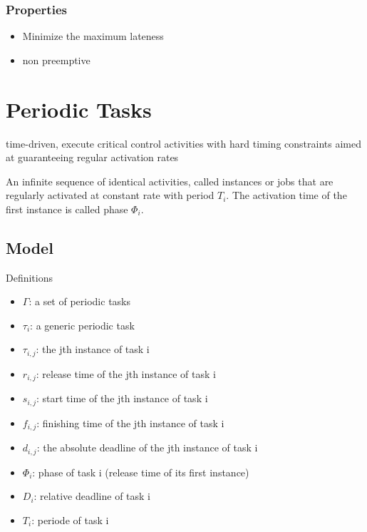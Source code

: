 \subsubsection{Properties}
\begin{itemize}[noitemsep]
\item Minimize the maximum lateness
\item non preemptive
\end{itemize}



\newpage











\section{Periodic Tasks}

time-driven, execute critical control activities with hard timing constraints aimed at guaranteeing regular activation rates

\begin{definition}
An infinite sequence of identical activities, called instances or jobs that are regularly activated at constant rate with period $T_i$. The activation time of the first instance is called phase $\Phi_i$.
\end{definition}

\subsection{Model}
Definitions
\begin{itemize}[noitemsep]
\item $\Gamma$:  a set of periodic tasks
\item $\tau_i$: a generic periodic task
\item $\tau_{i, j}$: the jth instance of task i
\item $r_{i, j}$: release time of the jth instance of task i
\item $s_{i, j}$: start time of the jth instance of task i
\item $f_{i, j}$: finishing time of the jth instance of task i
\item $d_{i, j}$: the absolute deadline of the jth instance of task i
\item $\Phi_i$: phase of task i (release time of its first instance)
\item $D_i$: relative deadline of task i
\item $T_i$: periode of task i
\end{itemize}

